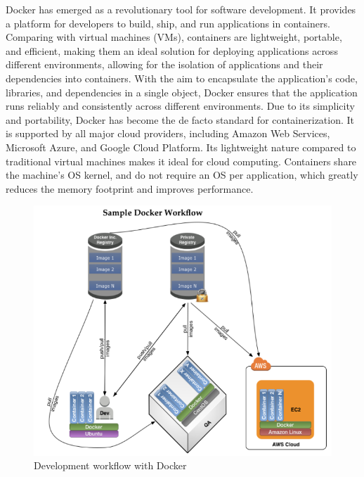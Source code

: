 Docker has emerged as a revolutionary tool for software development. It provides a platform for developers to build, ship, and run applications in containers. 
Comparing with virtual machines (VMs), containers are lightweight, portable, and efficient, making them an ideal solution for deploying applications across different environments, allowing 
for the isolation of applications and their dependencies into containers. 
With the aim to encapsulate the application's code, libraries, and dependencies in a single object, Docker ensures that the application runs reliably and consistently across different environments.
Due to its simplicity and portability, Docker has become the de facto standard for containerization. It is supported by all major cloud providers, including Amazon Web Services, Microsoft Azure, and Google Cloud Platform. Its lightweight nature compared to traditional virtual machines makes it ideal for cloud computing. Containers share the machine's OS kernel, and do not require an OS per application, which greatly reduces the memory footprint and improves performance. \cite{merkel2014docker}

\begin{figure}[ht]
    \centering
    \includegraphics[width=0.8\linewidth]{images/docker.png}
    \caption{Development workflow with Docker}
    \label{fig:docker}
\end{figure}

